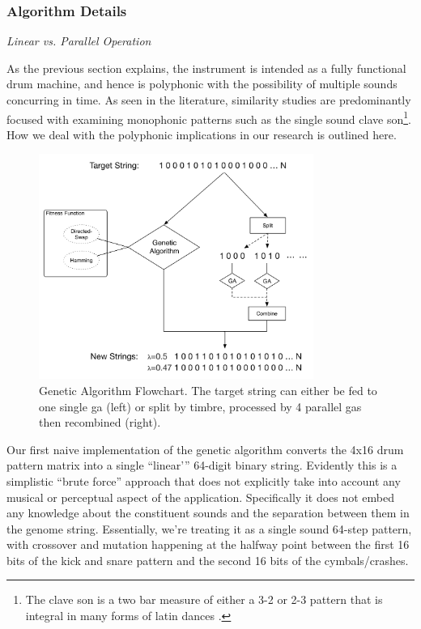 \subsubsection*{Algorithm Details}

\textit{Linear vs. Parallel Operation}

As the previous section explains, the instrument is intended as a fully functional drum machine, and hence is polyphonic with the possibility of multiple sounds concurring in time. As seen in the literature, similarity studies are predominantly focused with examining monophonic patterns such as the single sound clave son\footnote{The clave son is a two bar measure of either a 3-2 or 2-3 pattern that is integral in many forms of latin dances \citep{Sethares2007}.}. How we deal with the polyphonic implications in our research is outlined here.

\begin{figure}
	\begin{center}
		\includegraphics[width=0.8\textwidth]{ch03_symbolic/figures/ga_algorithm.png}
	\end{center}
	\caption[Genetic Algorithm Flowchart]{Genetic Algorithm Flowchart. The target string can either be fed to one single \acrshort{ga} (left) or split by timbre, processed by 4 parallel \acrshort{ga}s then recombined (right).}
	\label{fig:genetic}
\end{figure}

Our first naive implementation of the genetic algorithm converts the 4x16 drum pattern matrix into a single “linear'” 64-digit binary string. Evidently this is a simplistic ``brute force'' approach that does not explicitly take into account any musical or perceptual aspect of the application. Specifically it does not embed any knowledge about the constituent sounds and the separation between them in the genome string. Essentially, we’re treating it as a single sound 64-step pattern, with crossover and mutation happening at the halfway point between the first 16 bits of the kick and snare pattern and the second 16 bits of the cymbals/crashes. 

